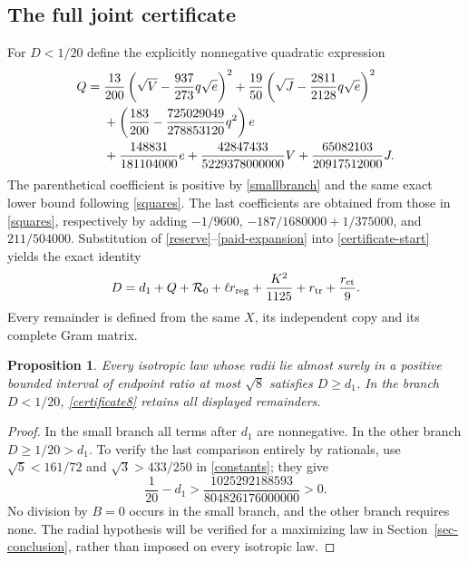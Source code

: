 \documentclass[11pt]{article}
\newtheorem{proposition}[theorem]{Proposition}
\theoremstyle{remark}\newtheorem{remark}[theorem]{Remark}
\numberwithin{equation}{section}
\begin{document}
\subsection{The full joint certificate}
For $D<1/20$ define the explicitly nonnegative quadratic expression
\begin{align}\label{Q8}
 Q={}&\frac{13}{200}\left(\sqrt V-\frac{937}{273}q\sqrt e\right)^2
       +\frac{19}{50}\left(\sqrt J-\frac{2811}{2128}q\sqrt e\right)^2\notag\\
 &+\left(\frac{183}{200}-\frac{725029049}{278853120}q^2\right)e\notag\\
 &+\frac{148831}{181104000}e
       +\frac{42847433}{5229378000000}V+\frac{65082103}{20917512000}J.
\end{align}
The parenthetical coefficient is positive by \eqref{smallbranch} and the
same exact lower bound following \eqref{squares}. The last coefficients are
obtained from those in \eqref{squares}, respectively by adding
$-1/9600$, $-187/1680000+1/375000$, and $211/504000$.
Substitution of \eqref{reserve}--\eqref{paid-expansion} into \eqref{certificate-start} yields the exact identity
\begin{equation}\label{certificate8}
 D=d_1+Q+{\cal R}_0+\ell r_{\rm reg}
          +\frac{K^2}{1125}+r_{\rm tr}+\frac{r_{\rm ct}}9.
\end{equation}
Every remainder is defined from the same $X$, its independent copy and its
complete Gram matrix.
\begin{proposition}\label{conditional8}
Every isotropic law whose radii lie almost surely in a positive bounded
interval of endpoint ratio at most $\sqrt8$ satisfies $D\ge d_1$.
In the branch $D<1/20$, \eqref{certificate8} retains all displayed remainders.
\end{proposition}
\begin{proof}
In the small branch all terms after $d_1$ are nonnegative. In the other
branch $D\ge1/20>d_1$. To verify the last comparison entirely by rationals,
use $\sqrt5<161/72$ and $\sqrt3>433/250$ in \eqref{constants}; they give
\[
 \frac1{20}-d_1>\frac{1025292188593}{804826176000000}>0.
\]
No division by $B=0$ occurs in the small branch, and the other branch
requires none. The radial hypothesis will be verified for a maximizing law in
Section~\ref{sec-conclusion}, rather than imposed on every isotropic law.
\end{proof}
\end{document}
